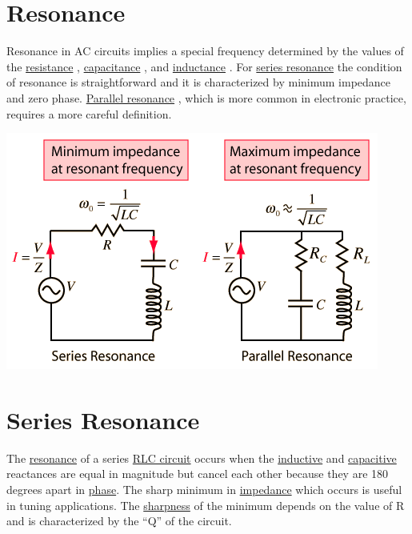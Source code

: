 \protect\hypertarget{c1}{}{}


\section{Resonance}\label{resonance}

Resonance in AC circuits implies a special frequency determined by the
values of the
\href{http://hyperphysics.phy-astr.gsu.edu/hbase/electric/acres.html\#c1}{resistance}
,
\href{http://hyperphysics.phy-astr.gsu.edu/hbase/electric/accap.html\#c1}{capacitance}
, and
\href{http://hyperphysics.phy-astr.gsu.edu/hbase/electric/acind.html\#c1}{inductance}
. For
\href{http://hyperphysics.phy-astr.gsu.edu/hbase/electric/serres.html\#c2}{series
resonance} the condition of resonance is straightforward and it is
characterized by minimum impedance and zero phase.
\href{http://hyperphysics.phy-astr.gsu.edu/hbase/electric/parres.html\#c1}{Parallel
resonance} , which is more common in electronic practice, requires a
more careful definition.


\includegraphics{./resonant-rlc-circuits_files/acres.png}

\protect\hypertarget{c2}{}{}

\section{Series Resonance}\label{series-resonance}

The
\href{http://hyperphysics.phy-astr.gsu.edu/hbase/electric/serres.html\#c1}{resonance}
of a series
\href{http://hyperphysics.phy-astr.gsu.edu/hbase/electric/rlcser.html\#c1}{RLC
circuit} occurs when the
\href{http://hyperphysics.phy-astr.gsu.edu/hbase/electric/acind.html\#c1}{inductive}
and
\href{http://hyperphysics.phy-astr.gsu.edu/hbase/electric/accap.html\#c1}{capacitive}
reactances are equal in magnitude but cancel each other because they are
180 degrees apart in
\href{http://hyperphysics.phy-astr.gsu.edu/hbase/electric/phase.html\#c1}{phase}.
The sharp minimum in
\href{http://hyperphysics.phy-astr.gsu.edu/hbase/electric/imped.html\#c1}{impedance}
which occurs is useful in tuning applications. The
\href{http://hyperphysics.phy-astr.gsu.edu/hbase/electric/serres.html\#c3}{sharpness}
of the minimum depends on the value of R and is characterized by the
``Q'' of the circuit.



